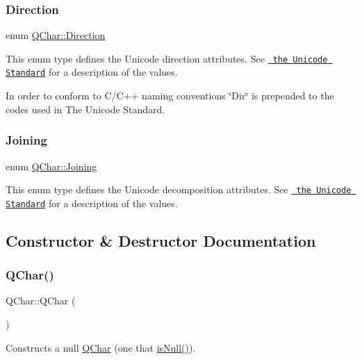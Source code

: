 \subsubsection{\texorpdfstring{Direction}{Direction}}
{\footnotesize\ttfamily enum \mbox{\hyperlink{class_q_char_a54978126be7630b3e85394325a822302}{Q\+Char\+::\+Direction}}}

This enum type defines the Unicode direction attributes. See \href{http://www.unicode.org}{\texttt{ the Unicode Standard}} for a description of the values.

In order to conform to C/\+C++ naming conventions \char`\"{}\+Dir\char`\"{} is prepended to the codes used in The Unicode Standard. \mbox{\label{class_q_char_a086edd55a90ad2cf910ca3ab5fbe7bde}} 
\subsubsection{\texorpdfstring{Joining}{Joining}}
{\footnotesize\ttfamily enum \mbox{\hyperlink{class_q_char_a086edd55a90ad2cf910ca3ab5fbe7bde}{Q\+Char\+::\+Joining}}}

This enum type defines the Unicode decomposition attributes. See \href{http://www.unicode.org}{\texttt{ the Unicode Standard}} for a description of the values. 

\subsection{Constructor \& Destructor Documentation}
\mbox{\label{class_q_char_a982aca321d746686396ab5290955da95}} 
\subsubsection{\texorpdfstring{QChar()}{QChar()}\hspace{0.1cm}{\footnotesize\ttfamily [1/9]}}
{\footnotesize\ttfamily Q\+Char\+::\+Q\+Char (\begin{DoxyParamCaption}{ }\end{DoxyParamCaption})\hspace{0.3cm}{\ttfamily [inline]}}

Constructs a null \mbox{\hyperlink{class_q_char}{Q\+Char}} (one that \mbox{\hyperlink{class_q_char_a580c84db3f1208df21a8427a01fc725c}{is\+Null()}}). \mbox{\label{class_q_char_a9d4a3fc3b41479f13c1174995d1390d5}} 
